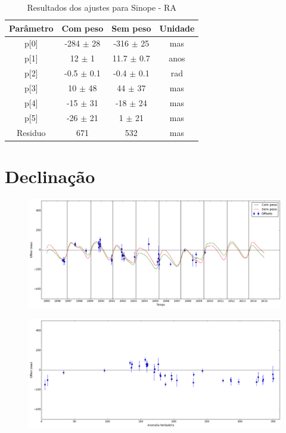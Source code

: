 \documentclass[11pt,a4paper]{report}
\begin{document}
\begin{table}[h!]
\caption{\label{Tab: Sinope-RA} Resultados dos ajustes para Sinope - RA}
\begin{centering}
\begin{tabular}{cccc}
\hline
\hline
Parâmetro & Com peso & Sem peso & Unidade\tabularnewline
\hline
p[0] & -284 $\pm$ 28 & -316 $\pm$ 25 & mas\\
p[1] & 12 $\pm$ 1 & 11.7 $\pm$ 0.7 & anos\\
p[2] & -0.5 $\pm$ 0.1 & -0.4 $\pm$ 0.1 & rad\\
p[3] & 10 $\pm$ 48 & 44 $\pm$ 37 & mas\\
p[4] & -15 $\pm$ 31 & -18 $\pm$ 24 & mas\\
p[5] & -26 $\pm$ 21 & 1 $\pm$ 21 & mas\\
Residuo & 671 & 532 & mas\\
\hline 
\end{tabular} 
\par\end{centering}
\end{table}

\section*{Declinação}

\begin{figure}[h]
\includegraphics[scale=0.35]{Sinope/DEC.png} 
\end{figure}

\begin{figure}[h]
\includegraphics[scale=0.35]{Sinope/DEC_anom.png}  
\end{figure}
\end{document}
